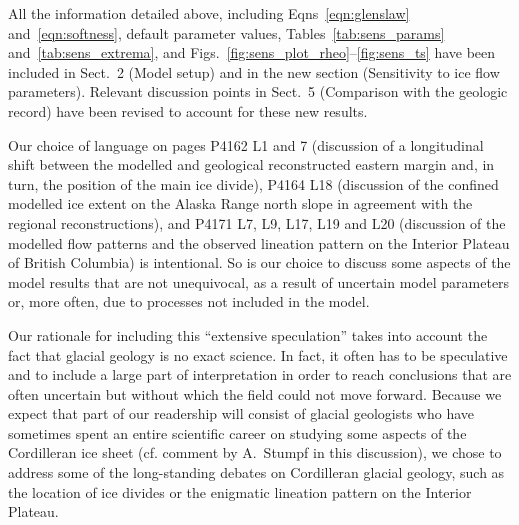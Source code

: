 
All the information detailed above, including
Eqns~\ref{eqn:glenslaw} and~\ref{eqn:softness}, default parameter values,
Tables~\ref{tab:sens_params} and~\ref{tab:sens_extrema}, and
Figs.~\ref{fig:sens_plot_rheo}--\ref{fig:sens_ts} have been included in Sect.~2
(Model setup) and in the new section (Sensitivity to ice flow parameters).
Relevant discussion points in Sect.~5 (Comparison with the geologic record)
have been revised to account for these new results.


Our choice of language on pages P4162 L1 and 7 (discussion of a longitudinal shift
between the modelled and geological reconstructed eastern margin and, in turn,
the position of the main ice divide), P4164 L18 (discussion of the confined
modelled ice extent on the Alaska Range north slope in agreement with the
regional reconstructions), and P4171
L7, L9, L17, L19 and L20 (discussion of the modelled flow patterns and the
observed lineation pattern on the Interior Plateau of British Columbia) is
intentional. So is our choice to discuss some aspects of the model results that
are not unequivocal, as a result of uncertain model parameters or, more often,
due to processes not included in the model.

Our rationale for including this ``extensive speculation'' takes into account
the fact that glacial geology is no exact science. In fact, it often has to be
speculative and to include a large part of interpretation in order to reach
conclusions that are often uncertain but without which the field could not move
forward. Because we expect that part of our readership will consist of glacial
geologists who have sometimes spent an entire scientific career on studying
some aspects of the Cordilleran ice sheet (cf. comment by A.~Stumpf in this
discussion), we chose to address some of the long-standing debates on
Cordilleran glacial geology, such as the location of ice divides or
the enigmatic lineation pattern on the Interior Plateau.


